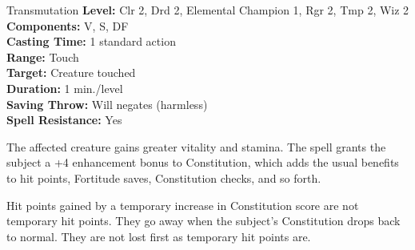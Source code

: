{Transmutation}
{
	\textbf{Level:}
	Clr 2, Drd 2, Elemental Champion 1, Rgr 2, Tmp 2, Wiz 2\\
	\textbf{Components:}
	V, S, DF\\
	\textbf{Casting Time:}
	1 standard action\\
	\textbf{Range:}
	Touch\\
	\textbf{Target:}
	Creature touched\\
	\textbf{Duration:}
	1 min./level\\
	\textbf{Saving Throw:}
	Will negates (harmless)\\
	\textbf{Spell Resistance:}
	Yes\\
}
{
	The affected creature gains greater vitality and stamina. The spell grants the subject a +4 enhancement bonus to Constitution, which adds the usual benefits to hit points, Fortitude saves, Constitution checks, and so forth.

	Hit points gained by a temporary increase in Constitution score are not temporary hit points. They go away when the subject's Constitution drops back to normal. They are not lost first as temporary hit points are.

}
